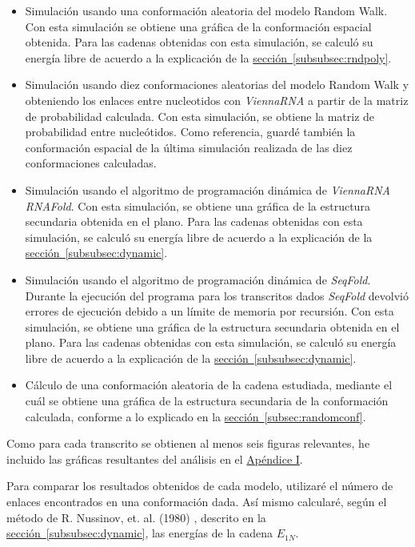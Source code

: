 \documentclass[a4paper,11pt,titlepage]{article}
\newcommand{\nr}[2][sección]{\hyperref[#2]{#1~\ref{#2}}}
\theoremstyle{definition}
\begin{document}
\begin{itemize}
    \item Simulación usando una conformación aleatoria del modelo Random Walk. Con esta simulación se obtiene una gráfica de la conformación espacial obtenida. Para las cadenas obtenidas con esta simulación, se calculó su energía libre de acuerdo a la explicación de la \nr[sección]{subsubsec:rndpoly}.
    \item Simulación usando diez conformaciones aleatorias del modelo Random Walk y obteniendo los enlaces entre nucleotidos con \textit{ViennaRNA} a partir de la matriz de probabilidad calculada. Con esta simulación, se obtiene la matriz de probabilidad entre nucleótidos. Como referencia, guardé también la conformación espacial de la última simulación realizada de las diez conformaciones calculadas.
    \item Simulación usando el algoritmo de programación dinámica de \textit{ViennaRNA RNAFold}. Con esta simulación, se obtiene una gráfica de la estructura secundaria obtenida en el plano. Para las cadenas obtenidas con esta simulación, se calculó su energía libre de acuerdo a la explicación de la \nr[sección]{subsubsec:dynamic}.
    \item Simulación usando el algoritmo de programación dinámica de \textit{SeqFold}. Durante la ejecución del programa para los transcritos dados \textit{SeqFold} devolvió errores de ejecución debido a un límite de memoria por recursión. Con esta simulación, se obtiene una gráfica de la estructura secundaria obtenida en el plano. Para las cadenas obtenidas con esta simulación, se calculó su energía libre de acuerdo a la explicación de la \nr[sección]{subsubsec:dynamic}.
    \item Cálculo de una conformación aleatoria de la cadena estudiada, mediante el cuál se obtiene una gráfica de la estructura secundaria de la conformación calculada, conforme a lo explicado en la \nr[sección]{subsec:randomconf}.
\end{itemize}


Como para cada transcrito se obtienen al menos seis figuras relevantes, he incluido las gráficas resultantes del análisis en el \hyperref[sec:graphs]{Apéndice I}.

Para comparar los resultados obtenidos de cada modelo, utilizaré el número de enlaces encontrados en una conformación dada. Así mismo calcularé, según el método de R. Nussinov, et. al. (1980) \cite{nussinov}, descrito en la \nr[sección]{subsubsec:dynamic}, las energías de la cadena $E_{1N}$.
\end{document}
